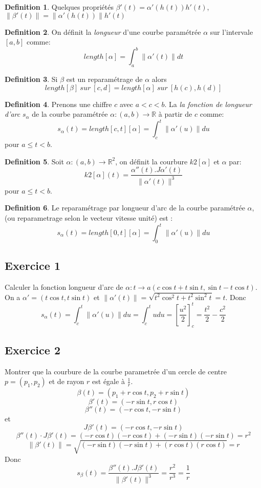 \documentclass[]{book}
\theoremstyle{definition}
\newtheorem{defn}{Definition}
\newcommand{\bb}[1]{\mathbb{#1}}
\newcommand{\R}{\bb{R}}
\begin{document}
 
\begin{defn}
Quelques propri\'et\'es $\beta'(t) = \alpha'(h(t))h'(t)$, $\lVert \beta'(t)\rVert = \lVert\alpha'(h(t))\rVert h'(t)$
\end{defn}
 

\begin{defn}
On d\'efinit la \emph{longueur} d'une courbe param\'etr\'ee $\alpha$ sur l'intervale $[a,b]$ comme:
$$length[\alpha] = \int_a^b \lVert \alpha'(t)\rVert dt$$
\end{defn}

\begin{defn}
Si $\beta$ est un reparam\'etrage de $\alpha$ alors
$$length[\beta] \ sur\ [c,d] = length[\alpha]  \ sur\ [h(c),h(d)]$$ 
\end{defn}
 

\begin{defn}
Prenons une chiffre $c$ avec $a < c < b$. La \emph{la fonction de longueur d'arc} $s_{\alpha}$ de la courbe param\'etr\'ee $\alpha:(a,b) \to \R$ \`a partir de $c$ comme:
$$
s_{\alpha}(t) = length[c,t][\alpha] = \int_c^t \lVert \alpha'(u) \rVert du
$$ 
pour $a \le t < b$.
\end{defn}
 
\begin{defn}
Soit $\alpha: (a,b) \to \R^2$, on d\'efinit la courbure $k2[\alpha]$ et $\alpha$ par:
$$
k2[\alpha](t) = \frac{\alpha''(t).J\alpha'(t)}{\lVert \alpha'(t) \rVert^3}
$$ 
pour $a \le t < b$.
\end{defn}


\begin{defn}
Le reparam\'etrage par longueur d'arc de la courbe param\'etr\'ee $\alpha$, (ou reparametrage selon le vecteur vitesse unit\'e) est :
$$
s_{\alpha}(t) = length[0,t][\alpha] = \int_0^t \lVert \alpha'(u) \rVert du
$$ 
\end{defn}

\subsection*{Exercice 1}
Calculer la fonction longueur d'arc de $\alpha: t \to a(c\cos t + t\sin t, \sin t - t\cos t)$.
On a $\alpha' = (t \cos t, t \sin t)$ et $\lVert \alpha'(t) \rVert = \sqrt{t^2 \cos^2 t + t^2 \sin^2 t} = t$.
Donc
$$
s_{\alpha}(t) = \int_c^t \lVert \alpha'(u) \rVert du = \int_c^t{u du} = \left[ \frac{u^2}{2} \right]_c^t = \frac{t^2}{2} - \frac{c^2}{2}
$$ 

\subsection*{Exercice 2}
Montrer que la courbure de la courbe parametr\'ee d'un cercle de centre $p = (p_1, p_2)$ et de rayon $r$ est \'egale \`a $\frac{1}{r}$.
$$\beta(t) = (p_1 + r\cos t, p_2 + r\sin t)$$
$$\beta'(t) = (-r\sin t, r\cos t)$$
$$\beta''(t) = (-r\cos t, -r\sin t)$$
et
$$J\beta'(t) = (-r\cos t, -r\sin t)$$
$$\beta''(t) \cdot J\beta'(t) = (-r \cos t)(-r \cos t) + (-r \sin t)(-r \sin t) = r^2$$
$$\lVert \beta'(t) \rVert = \sqrt{(-r \sin t)(-r \sin t) + (r \cos t)(r \cos t)} = r$$
Donc
$$
s_{\beta}(t) = \frac{\beta''(t).J\beta'(t)}{\lVert \beta'(t) \rVert^3} = \frac{r^2}{r^3} = \frac{1}{r}
$$ 
\end{document}
